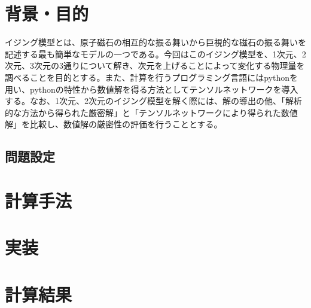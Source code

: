 \documentclass[dvipdfmx, titlepage]{jsarticle}   %
\begin{document}


\section{背景・目的}
イジング模型とは、原子磁石の相互的な振る舞いから巨視的な磁石の振る舞いを記述する最も簡単なモデルの一つである。今回はこのイジング模型を、1次元、2次元、3次元の3通りについて解き、次元を上げることによって変化する物理量を調べることを目的とする。また、計算を行うプログラミング言語にはpythonを用い、pythonの特性から数値解を得る方法としてテンソルネットワークを導入する。なお、1次元、2次元のイジング模型を解く際には、解の導出の他、「解析的な方法から得られた厳密解」と「テンソルネットワークにより得られた数値解」を比較し、数値解の厳密性の評価を行うこととする。

\subsection{問題設定}

\section{計算手法}

\section*{実装}

\section{計算結果}
\end{document}
